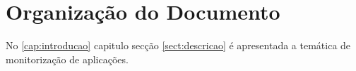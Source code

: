 % 
\bigskip 






\section{Organização do Documento}
\label{sec:intro_document_outline}

No \ref{cap:introducao} capitulo secção \ref{sect:descricao} é apresentada a temática de monitorização de aplicações.

